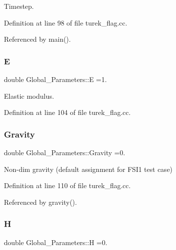 Timestep. 



Definition at line 98 of file turek\+\_\+flag.\+cc.



Referenced by main().

\mbox{\label{namespaceGlobal__Parameters_aa3dfbdb1b2fd80d516850f66c96b6fd0}} 
\subsubsection{\texorpdfstring{E}{E}}
{\footnotesize\ttfamily double Global\+\_\+\+Parameters\+::E =1.}



Elastic modulus. 



Definition at line 104 of file turek\+\_\+flag.\+cc.

\mbox{\label{namespaceGlobal__Parameters_a335000b5db4206486a116ae0468d2d0c}} 
\subsubsection{\texorpdfstring{Gravity}{Gravity}}
{\footnotesize\ttfamily double Global\+\_\+\+Parameters\+::\+Gravity =0.}



Non-\/dim gravity (default assignment for F\+S\+I1 test case) 



Definition at line 110 of file turek\+\_\+flag.\+cc.



Referenced by gravity().

\mbox{\label{namespaceGlobal__Parameters_ab360628e7830e43e355ce5768f6d6a6c}} 
\subsubsection{\texorpdfstring{H}{H}}
{\footnotesize\ttfamily double Global\+\_\+\+Parameters\+::H =0.}



